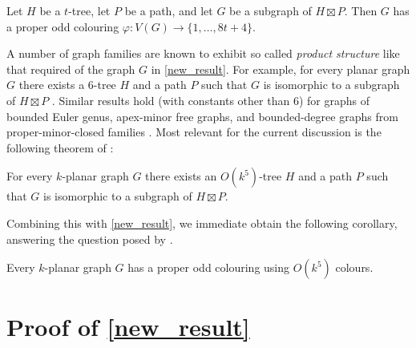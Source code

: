 \documentclass{patmorin}
\begin{document}
\begin{thm}\label{new_result}
  Let $H$ be a $t$-tree, let $P$ be a path, and let $G$ be a subgraph of $H\boxtimes P$. Then $G$ has a proper odd colouring $\varphi:V(G)\to\{1,\ldots,8t+4\}$.
\end{thm}

A number of graph families are known to exhibit so called \emph{product structure} like that required of the graph $G$ in \cref{new_result}.  For example, for every planar graph $G$ there exists a $6$-tree $H$ and a path $P$ such that $G$ is isomorphic to a subgraph of $H\boxtimes P$ \cite{ueckerdt.wood.ea:improved}.  Similar results hold (with constants other than $6$) for graphs of bounded Euler genus, apex-minor free graphs, and bounded-degree graphs from proper-minor-closed families \cite{dujmovic.joret.ea:planar,dujmovic.esperet.ea:clustered}.  Most relevant for the current discussion is the following theorem of \citet{dujmovic.morin.ea:structure}:

\begin{thm}\label{k_planar}
  For every $k$-planar graph $G$ there exists an $O(k^5)$-tree $H$ and a path $P$ such that $G$ is isomorphic to a subgraph of $H\boxtimes P$.
\end{thm}

Combining this with \cref{new_result}, we immediate obtain the following corollary, answering the question posed by \citet{cranston.lafferty.ea:note}.

\begin{cor}
  Every $k$-planar graph $G$ has a proper odd colouring using $O(k^5)$ colours.
\end{cor}

\section{Proof of \cref{new_result}}
\end{document}
